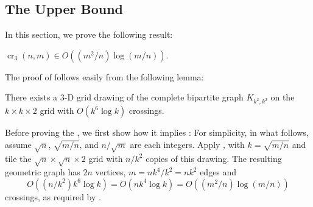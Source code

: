 \documentclass{patmorin}
\DeclareMathOperator{\crs}{cr}
\begin{document}
\subsection{The Upper Bound}

In this section, we prove the following result:

\begin{thm}
  $\crs_3(n,m) \in O((m^2/n)\log (m/n))$.
\end{thm}

The proof of  follows easily from the following
lemma:
\begin{lem}
  There exists a 3-D grid drawing of the complete bipartite
  graph $K_{k^2,k^2}$ on the $k\times k\times 2$ grid with $O(k^6\log
  k)$ crossings.
\end{lem}

Before proving the , we first show how it implies
: For simplicity, in what follows, assume
$\sqrt{n}$, $\sqrt{m/n}$, and $n/\sqrt{m}$ are each integers.
Apply , with $k=\sqrt{m/n}$ and tile the
$\sqrt{n}\times\sqrt{n}\times 2$ grid with $n/k^2$ copies of this
drawing. The resulting geometric graph has $2n$ vertices, $m=nk^4/k^2=nk^2$
edges and
\[ 
   O((n/k^2)k^6\log k) = O(nk^4\log k) = O((m^2/n)\log(m/n))
\] 
crossings, as required by .
\end{document}
